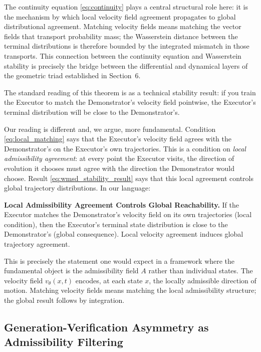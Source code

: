 \documentclass[12pt, a4paper]{article}
\theoremstyle{plain}
\theoremstyle{definition}
\theoremstyle{remark}
\newcommand{\fA}{A}
\begin{document}
The continuity equation \eqref{eq:continuity} plays a central structural role
here: it is the mechanism by which local velocity field agreement propagates
to global distributional agreement. Matching velocity fields means matching
the vector fields that transport probability mass; the Wasserstein distance
between the terminal distributions is therefore bounded by the integrated
mismatch in those transports. This connection between the continuity equation
and Wasserstein stability is precisely the bridge between the differential
and dynamical layers of the geometric triad established in Section~6.

The standard reading of this theorem is as a technical stability result: if
you train the Executor to match the Demonstrator's velocity field pointwise,
the Executor's terminal distribution will be close to the Demonstrator's.

Our reading is different and, we argue, more fundamental. Condition
\eqref{eq:local_matching} says that the Executor's velocity field agrees with
the Demonstrator's on the Executor's own trajectories. This is a condition on
\emph{local admissibility agreement}: at every point the Executor visits, the
direction of evolution it chooses must agree with the direction the Demonstrator
would choose. Result \eqref{eq:wmsd_stability_result} says that this local
agreement controls global trajectory distributions. In our language:

\begin{principleBox}
  \textbf{Local Admissibility Agreement Controls Global Reachability.}
  If the Executor matches the Demonstrator's velocity field on its own
  trajectories (local condition), then the Executor's terminal state
  distribution is close to the Demonstrator's (global consequence). Local
  velocity agreement induces global trajectory agreement.
\end{principleBox}

This is precisely the statement one would expect in a framework where the
fundamental object is the admissibility field $\fA$ rather than individual
states. The velocity field $v_\theta(x,t)$ encodes, at each state $x$, the
locally admissible direction of motion. Matching velocity fields means matching
the local admissibility structure; the global result follows by integration.

\subsection{Generation-Verification Asymmetry as Admissibility Filtering}
\end{document}
